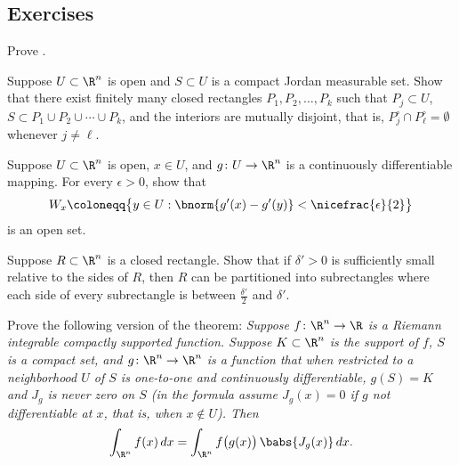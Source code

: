 \subsection{Exercises}

\begin{exercise}
Prove .
\end{exercise}

\begin{exercise} \label{mv:changeofvarcoverbyrects}
Suppose $U \subset \R^n$ is open
and $S \subset U$ is a compact Jordan measurable set.
Show that there exist finitely many closed rectangles
$P_1,P_2, \ldots, P_k$ such that $P_j \subset U$,
$S \subset P_1 \cup P_2 \cup \cdots \cup P_k$, and
the interiors are mutually disjoint, that is,
$P_j^\circ \cap P^\circ_\ell = \emptyset$ whenever $j \not= \ell$.
\end{exercise}

\begin{exercise} \label{mv:changeofvarWxopen}
Suppose $U \subset \R^n$ is open, $x \in U$,
and $g \colon U \to \R^n$ is a continuously differentiable mapping.
For every $\epsilon > 0$, show that
\begin{equation*}
W_x \coloneqq \bigl\{ y \in U : \bnorm{g'(x)-g'(y)} < \nicefrac{\epsilon}{2} \bigr\}
\end{equation*}
is an open set.
\end{exercise}

\begin{exercise} \label{mv:changeofvarrectside}
Suppose $R \subset \R^n$ is a closed rectangle.
Show that if $\delta' > 0$ is sufficiently small relative
to the sides of $R$, then $R$ can be partitioned
into subrectangles where each side of every subrectangle
is between $\frac{\delta'}{2}$ and $\delta'$.
\end{exercise}

\begin{exercise}
Prove the following version of the theorem:
\emph{Suppose $f \colon \R^n \to \R$ is a Riemann integrable
compactly supported function.  Suppose $K \subset \R^n$
is the support of $f$, $S$ is a compact set,
and $g \colon \R^n \to \R^n$ is
a function that when restricted to a neighborhood $U$ of
$S$ is one-to-one and continuously differentiable,
$g(S) = K$ and $J_g$ is never zero on $S$ (in the formula 
assume $J_g(x) = 0$ if $g$ not differentiable at $x$, that is, when $x \notin
U$).  Then}
\begin{equation*}
\int_{\R^{n}} f(x) \, dx = 
\int_{\R^n} f\bigl(g(x)\bigr) \, \babs{J_g(x)} \, dx .
\end{equation*}
\end{exercise}

